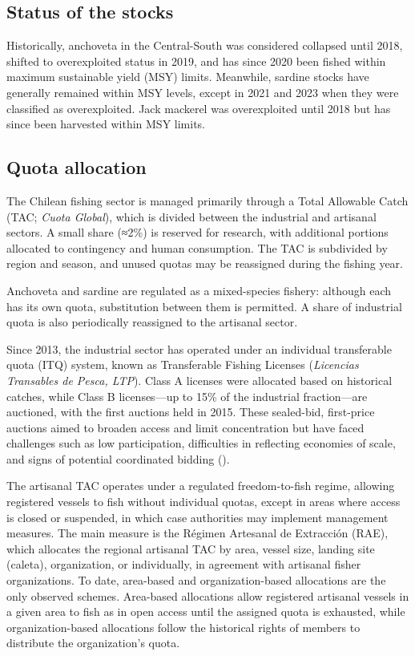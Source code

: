 \documentclass[
  11pt,
]{article}
\begin{document}
\subsection{Status of the stocks}\label{status-of-the-stocks}

Historically, anchoveta in the Central-South was considered collapsed
until 2018, shifted to overexploited status in 2019, and has since 2020
been fished within maximum sustainable yield (MSY) limits. Meanwhile,
sardine stocks have generally remained within MSY levels, except in 2021
and 2023 when they were classified as overexploited. Jack mackerel was
overexploited until 2018 but has since been harvested within MSY limits.

\subsection{Quota allocation}\label{quota-allocation}

The Chilean fishing sector is managed primarily through a Total Allowable Catch (TAC; \emph{Cuota Global}), which is divided between the industrial and artisanal sectors. A small share (≈2\%) is reserved for research, with additional portions allocated to contingency and human consumption. The TAC is subdivided by region and season, and unused quotas may be reassigned during the fishing year.

Anchoveta and sardine are regulated as a mixed-species fishery: although each has its own quota, substitution between them is permitted. A share
of industrial quota is also periodically reassigned to the artisanal sector.

Since 2013, the industrial sector has operated under an individual transferable quota (ITQ) system, known as Transferable Fishing Licenses
(\emph{Licencias Transables de Pesca, LTP}). Class A licenses were allocated based on historical catches, while Class B licenses---up to 15\% of the
industrial fraction---are auctioned, with the first auctions held in 2015. These sealed-bid, first-price auctions aimed to broaden access and limit
concentration but have faced challenges such as low participation,
difficulties in reflecting economies of scale, and signs of potential
coordinated bidding ().

The artisanal TAC operates under a regulated freedom-to-fish regime,
allowing registered vessels to fish without individual quotas, except in
areas where access is closed or suspended, in which case authorities may
implement management measures. The main measure is the Régimen Artesanal
de Extracción (RAE), which allocates the regional artisanal TAC by area,
vessel size, landing site (caleta), organization, or individually, in
agreement with artisanal fisher organizations. To date, area-based and
organization-based allocations are the only observed schemes. Area-based
allocations allow registered artisanal vessels in a given area to fish
as in open access until the assigned quota is exhausted, while
organization-based allocations follow the historical rights of members
to distribute the organization's quota.
\end{document}
